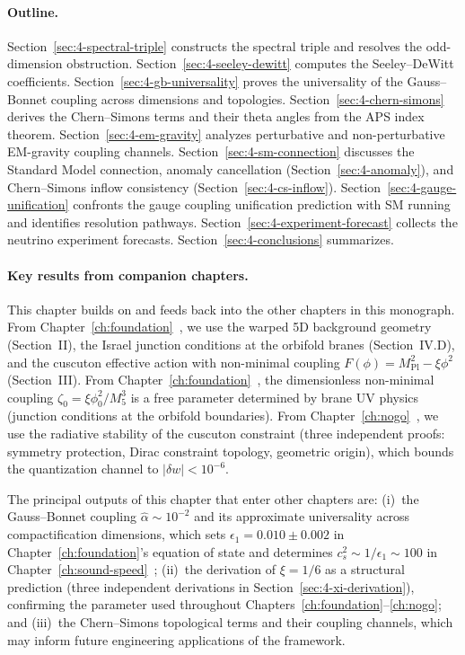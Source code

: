 \paragraph{Outline.}
Section~\ref{sec:4-spectral-triple} constructs the spectral triple and resolves the odd-dimension obstruction. Section~\ref{sec:4-seeley-dewitt} computes the Seeley--DeWitt coefficients. Section~\ref{sec:4-gb-universality} proves the universality of the Gauss--Bonnet coupling across dimensions and topologies. Section~\ref{sec:4-chern-simons} derives the Chern--Simons terms and their theta angles from the APS index theorem. Section~\ref{sec:4-em-gravity} analyzes perturbative and non-perturbative EM-gravity coupling channels. Section~\ref{sec:4-sm-connection} discusses the Standard Model connection, anomaly cancellation (Section~\ref{sec:4-anomaly}), and Chern--Simons inflow consistency (Section~\ref{sec:4-cs-inflow}).  Section~\ref{sec:4-gauge-unification} confronts the gauge coupling unification prediction with SM running and identifies resolution pathways.  Section~\ref{sec:4-experiment-forecast} collects the neutrino experiment forecasts.  Section~\ref{sec:4-conclusions} summarizes.

\paragraph{Key results from companion chapters.}
This chapter builds on and feeds back into the other chapters in this monograph. From Chapter~\ref{ch:foundation}~\cite{ch4:PaperI}, we use the warped 5D background geometry (Section~II), the Israel junction conditions at the orbifold branes (Section~IV.D), and the cuscuton effective action with non-minimal coupling $F(\phi) = M_{\mathrm{Pl}}^2 - \xi\phi^2$ (Section~III). From Chapter~\ref{ch:foundation}~\cite{ch4:PaperI}, the dimensionless non-minimal coupling $\zeta_0 = \xi\phi_0^2/M_5^3$ is a free parameter determined by brane UV physics (junction conditions at the orbifold boundaries). From Chapter~\ref{ch:nogo}~\cite{ch4:PaperIII}, we use the radiative stability of the cuscuton constraint (three independent proofs: symmetry protection, Dirac constraint topology, geometric origin), which bounds the quantization channel to $|\delta w| < 10^{-6}$.

The principal outputs of this chapter that enter other chapters are: (i)~the Gauss--Bonnet coupling $\hat{\alpha} \sim 10^{-2}$ and its approximate universality across compactification dimensions, which sets $\epsilon_1 = 0.010 \pm 0.002$ in Chapter~\ref{ch:foundation}'s equation of state and determines $c_s^2 \sim 1/\epsilon_1 \sim 100$ in Chapter~\ref{ch:sound-speed}~\cite{ch4:PaperV}; (ii)~the derivation of $\xi = 1/6$ as a structural prediction (three independent derivations in Section~\ref{sec:4-xi-derivation}), confirming the parameter used throughout Chapters~\ref{ch:foundation}--\ref{ch:nogo}; and (iii)~the Chern--Simons topological terms and their coupling channels, which may inform future engineering applications of the framework.


